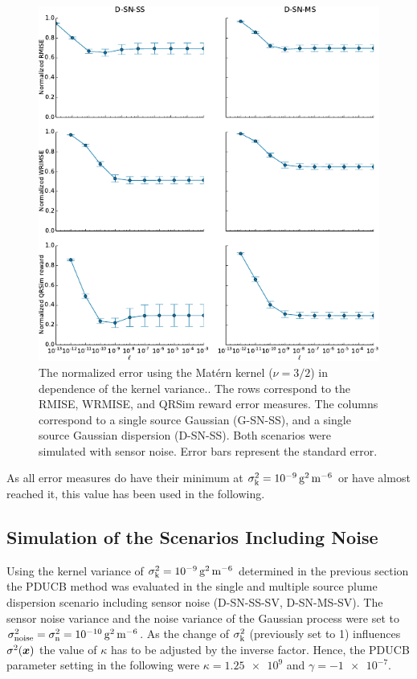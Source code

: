 \begin{figure}
    \centering
    \includegraphics{plots/kvar}
    \caption[Influence of the kernel variance]{The normalized error using the 
        Mat\'ern kernel ($\nu = 3/2$) in dependence of the kernel variance..  
        The rows correspond to the RMISE, WRMISE, and QRSim reward error 
        measures.  The columns correspond to a single source Gaussian (G-SN-SS), 
        and a single source Gaussian dispersion (D-SN-SS). Both scenarios were 
        simulated with sensor noise.  Error bars represent the standard 
        error.}\label{fig:kvar}
\end{figure}

As all error measures do have their minimum at $\sigma\ped{k}^2 
= \SI{1e-9}{\gram\squared\per\meter\tothe{6}}$ or have almost reached it, this 
value has been used in the following.

\subsection{Simulation of the Scenarios Including Noise}
Using the kernel variance of $\sigma\ped{k}^2 
= \SI{1e-9}{\gram\squared\per\meter\tothe{6}}$ determined in the previous 
section the PDUCB method was evaluated in the single and multiple source plume 
dispersion scenario including sensor noise (D-SN-SS-SV, D-SN-MS-SV). The sensor 
noise variance and the noise variance of the Gaussian process were set to 
$\sigma\ped{noise}^2 = \sigma\ped{n}^2 
= \SI{1e-10}{\gram\squared\per\meter\tothe{6}}$.  As the change of 
$\sigma_{\mathrm{k}}^2$ (previously set to 1) influences $\sigma^2(\bm{x})$ the value 
of $\kappa$ has to be adjusted by the inverse factor. Hence, the PDUCB parameter 
setting in the following were $\kappa = \num{1.25e9}$ and $\gamma 
= \num{-1e-7}$.

